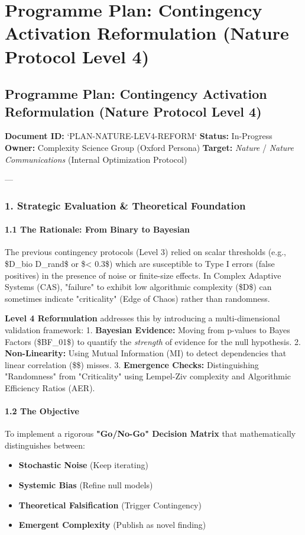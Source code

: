 \documentclass{article}
\begin{document}
\section{Programme Plan: Contingency Activation Reformulation (Nature Protocol Level 4)}
\subsection{Programme Plan: Contingency Activation Reformulation (Nature Protocol Level 4)}
\textbf{Document ID:} `PLAN-NATURE-LEV4-REFORM`
\textbf{Status:} In-Progress
\textbf{Owner:} Complexity Science Group (Oxford Persona)
\textbf{Target:} \textit{Nature} / \textit{Nature Communications} (Internal Optimization Protocol)

---

\subsubsection{1. Strategic Evaluation \& Theoretical Foundation}

\paragraph{1.1 The Rationale: From Binary to Bayesian}
The previous contingency protocols (Level 3) relied on scalar thresholds (e.g., \$D\_{bio} \approx D\_{rand}\$ or \$\rho < 0.3\$) which are susceptible to Type I errors (false positives) in the presence of noise or finite-size effects. In Complex Adaptive Systems (CAS), "failure" to exhibit low algorithmic complexity (\$D\$) can sometimes indicate "criticality" (Edge of Chaos) rather than randomness.

\textbf{Level 4 Reformulation} addresses this by introducing a multi-dimensional validation framework:
1.  \textbf{Bayesian Evidence:} Moving from p-values to Bayes Factors (\$BF\_{01}\$) to quantify the \textit{strength} of evidence for the null hypothesis.
2.  \textbf{Non-Linearity:} Using Mutual Information (MI) to detect dependencies that linear correlation (\$\rho\$) misses.
3.  \textbf{Emergence Checks:} Distinguishing "Randomness" from "Criticality" using Lempel-Ziv complexity and Algorithmic Efficiency Ratios (AER).

\paragraph{1.2 The Objective}
To implement a rigorous \textbf{"Go/No-Go" Decision Matrix} that mathematically distinguishes between:
\begin{itemize}
\item   \textbf{Stochastic Noise} (Keep iterating)
\item   \textbf{Systemic Bias} (Refine null models)
\item   \textbf{Theoretical Falsification} (Trigger Contingency)
\item   \textbf{Emergent Complexity} (Publish as novel finding)
\end{itemize}
\end{document}
